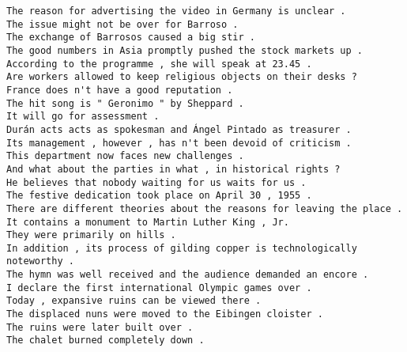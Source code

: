 \begin{verbatim}
The reason for advertising the video in Germany is unclear .
The issue might not be over for Barroso .
The exchange of Barrosos caused a big stir .
The good numbers in Asia promptly pushed the stock markets up .
According to the programme , she will speak at 23.45 .
Are workers allowed to keep religious objects on their desks ?
France does n't have a good reputation .
The hit song is " Geronimo " by Sheppard .
It will go for assessment .
Durán acts acts as spokesman and Ángel Pintado as treasurer .
Its management , however , has n't been devoid of criticism .
This department now faces new challenges .
And what about the parties in what , in historical rights ?
He believes that nobody waiting for us waits for us .
The festive dedication took place on April 30 , 1955 .
There are different theories about the reasons for leaving the place .
It contains a monument to Martin Luther King , Jr.
They were primarily on hills .
In addition , its process of gilding copper is technologically noteworthy .
The hymn was well received and the audience demanded an encore .
I declare the first international Olympic games over .
Today , expansive ruins can be viewed there .
The displaced nuns were moved to the Eibingen cloister .
The ruins were later built over .
The chalet burned completely down .
\end{verbatim}